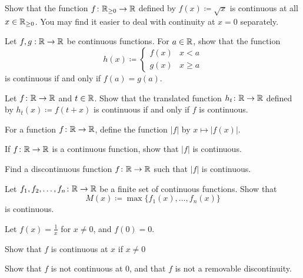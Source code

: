 \documentclass[../notes.tex]{subfiles}
\begin{document}
\begin{homework}
    Show that the function $f\colon\mathbb R_{\geq 0}\to \mathbb R$ defined by $f(x)\coloneqq\sqrt x$ is continuous at all $x\in \mathbb R_{\geq 0}$. You may find it easier to deal with continuity at $x=0$ separately.
\end{homework}

\begin{homework}
    Let $f, g:\mathbb R\to \mathbb R$ be continuous functions. For $a\in \mathbb R$, show that the function 
    \[ h(x)\coloneqq\begin{cases}
        f(x) &x< a \\
        g(x) &x\geq a
    \end{cases}\]
    is continuous if and only if $f(a)=g(a)$.
\end{homework}

\begin{homework}
    Let $f\colon\mathbb R\to \mathbb R$ and $t\in \mathbb R$. Show that the translated function $h_t\colon\mathbb R\to\mathbb R$ defined by $h_t(x)\coloneqq f(t+x)$ is continuous if and only if $f$ is continuous. 
\end{homework}

\begin{homework}
    For a function $f\colon\mathbb R\to\mathbb R$, define the function $|f|$ by $x\mapsto|f(x)|$.
    \begin{listalph}
        \item If $f\colon\mathbb R\to\mathbb R$ is a continuous function, show that $|f|$ is continuous.
        \item Find a discontinuous function $f\colon\mathbb R\to\mathbb R$ such that $|f|$ is continuous.
    \end{listalph}
\end{homework}

\begin{homework}
    Let $f_1, f_2, \dots, f_n \colon \mathbb R\to \mathbb R$ be a finite set of continuous functions. Show that 
    \[ M(x) \coloneqq \max\{f_1(x), \dots, f_n(x)\}\]
    is continuous.
\end{homework}

\begin{homework}
    Let $f(x)=\frac{1}{x}$ for $x\neq 0$, and $f(0)=0$.
    \begin{listalph}
        \item Show that $f$ is continuous at $x$ if $x\neq 0$
        \item Show that $f$ is not continuous at $0$, and that $f$ is {not} a removable discontinuity.
    \end{listalph}
\end{homework}
\end{document}
